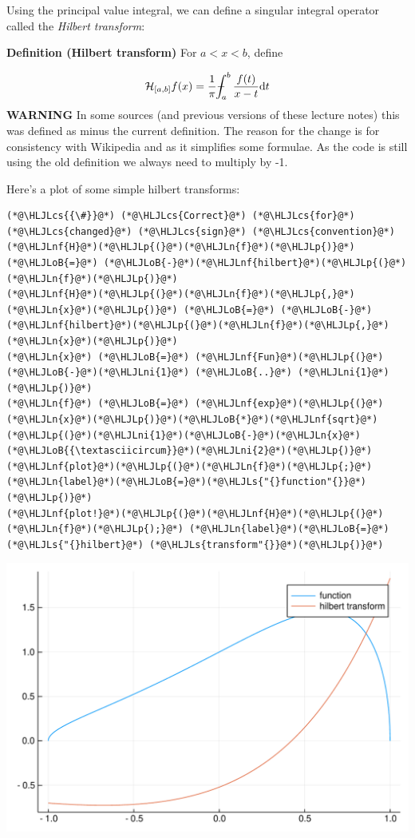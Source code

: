 \documentclass[12pt,a4paper]{article}
\newcommand{\HLJLn}[1]{#1}
\newcommand{\HLJLnf}[1]{\textcolor[RGB]{66,102,213}{#1}}
\newcommand{\HLJLs}[1]{\textcolor[RGB]{201,61,57}{#1}}
\newcommand{\HLJLni}[1]{\textcolor[RGB]{59,151,46}{#1}}
\newcommand{\HLJLoB}[1]{\textcolor[RGB]{102,102,102}{\textbf{#1}}}
\newcommand{\HLJLp}[1]{#1}
\newcommand{\HLJLcs}[1]{\textcolor[RGB]{153,153,119}{\textit{#1}}}
\def\D{ {\rm d} }
\def\HH{ {\cal H} }
\def\Xint#1{ \mathchoice
   {\XXint\displaystyle\textstyle{#1} }%
   {\XXint\textstyle\scriptstyle{#1} }%
   {\XXint\scriptstyle\scriptscriptstyle{#1} }%
   {\XXint\scriptscriptstyle\scriptscriptstyle{#1} }%
   \!\int}
\def\XXint#1#2#3{ {\setbox0=\hbox{$#1{#2#3}{\int}$}
     \vcenter{\hbox{$#2#3$}}\kern-.5\wd0} }
\def\dashint{\Xint-}
\begin{document}
Using the principal value integral, we can define a singular integral operator called the \emph{Hilbert transform}:

\textbf{Definition (Hilbert transform)} For $a < x < b$, define

\[
\HH_{[a,b]} f(x) =  {1 \over \pi} \dashint_a^b {f(t) \over {x-t}} \D t
\]
\textbf{WARNING} In some sources (and previous versions of these lecture notes) this was defined as minus the current definition. The reason for the change is for consistency with Wikipedia and as it simplifies some formulae. As the code is still using the old definition we always need to multiply by -1.

Here's a plot of some simple hilbert transforms:


\begin{lstlisting}
(*@\HLJLcs{{\#}}@*) (*@\HLJLcs{Correct}@*) (*@\HLJLcs{for}@*) (*@\HLJLcs{changed}@*) (*@\HLJLcs{sign}@*) (*@\HLJLcs{convention}@*)
(*@\HLJLnf{H}@*)(*@\HLJLp{(}@*)(*@\HLJLn{f}@*)(*@\HLJLp{)}@*) (*@\HLJLoB{=}@*) (*@\HLJLoB{-}@*)(*@\HLJLnf{hilbert}@*)(*@\HLJLp{(}@*)(*@\HLJLn{f}@*)(*@\HLJLp{)}@*)
(*@\HLJLnf{H}@*)(*@\HLJLp{(}@*)(*@\HLJLn{f}@*)(*@\HLJLp{,}@*)(*@\HLJLn{x}@*)(*@\HLJLp{)}@*) (*@\HLJLoB{=}@*) (*@\HLJLoB{-}@*)(*@\HLJLnf{hilbert}@*)(*@\HLJLp{(}@*)(*@\HLJLn{f}@*)(*@\HLJLp{,}@*)(*@\HLJLn{x}@*)(*@\HLJLp{)}@*)
(*@\HLJLn{x}@*) (*@\HLJLoB{=}@*) (*@\HLJLnf{Fun}@*)(*@\HLJLp{(}@*)(*@\HLJLoB{-}@*)(*@\HLJLni{1}@*) (*@\HLJLoB{..}@*) (*@\HLJLni{1}@*)(*@\HLJLp{)}@*)
(*@\HLJLn{f}@*) (*@\HLJLoB{=}@*) (*@\HLJLnf{exp}@*)(*@\HLJLp{(}@*)(*@\HLJLn{x}@*)(*@\HLJLp{)}@*)(*@\HLJLoB{*}@*)(*@\HLJLnf{sqrt}@*)(*@\HLJLp{(}@*)(*@\HLJLni{1}@*)(*@\HLJLoB{-}@*)(*@\HLJLn{x}@*)(*@\HLJLoB{{\textasciicircum}}@*)(*@\HLJLni{2}@*)(*@\HLJLp{)}@*)
(*@\HLJLnf{plot}@*)(*@\HLJLp{(}@*)(*@\HLJLn{f}@*)(*@\HLJLp{;}@*) (*@\HLJLn{label}@*)(*@\HLJLoB{=}@*)(*@\HLJLs{"{}function"{}}@*)(*@\HLJLp{)}@*)
(*@\HLJLnf{plot!}@*)(*@\HLJLp{(}@*)(*@\HLJLnf{H}@*)(*@\HLJLp{(}@*)(*@\HLJLn{f}@*)(*@\HLJLp{);}@*) (*@\HLJLn{label}@*)(*@\HLJLoB{=}@*)(*@\HLJLs{"{}hilbert}@*) (*@\HLJLs{transform"{}}@*)(*@\HLJLp{)}@*)
\end{lstlisting}

\includegraphics[width=\linewidth]{figures/Lecture14_2_1.pdf}
\end{document}
